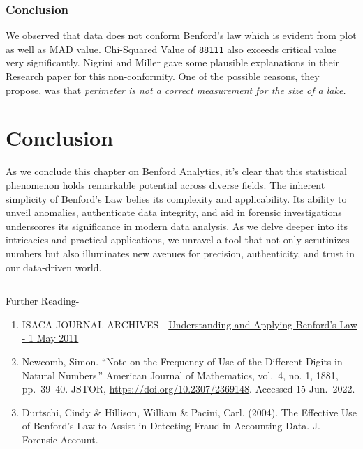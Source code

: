 \documentclass[
]{book}
\begin{document}
\hypertarget{conclusion-1}{%
\subsubsection*{Conclusion}\label{conclusion-1}}

We observed that data does not conform Benford's law which is evident from plot as well as MAD value. Chi-Squared Value of \texttt{88111} also exceeds critical value very significantly. Nigrini and Miller gave some plausible explanations in their Research paper \citep{article2007} for this non-conformity. One of the possible reasons, they propose, was that \emph{perimeter is not a correct measurement for the size of a lake.}

\hypertarget{conclusion-2}{%
\section{Conclusion}\label{conclusion-2}}

As we conclude this chapter on Benford Analytics, it's clear that this statistical phenomenon holds remarkable potential across diverse fields. The inherent simplicity of Benford's Law belies its complexity and applicability. Its ability to unveil anomalies, authenticate data integrity, and aid in forensic investigations underscores its significance in modern data analysis. As we delve deeper into its intricacies and practical applications, we unravel a tool that not only scrutinizes numbers but also illuminates new avenues for precision, authenticity, and trust in our data-driven world.

\begin{center}\rule{0.5\linewidth}{0.5pt}\end{center}

Further Reading-

\begin{enumerate}
\def\labelenumi{\arabic{enumi}.}
\item
  ISACA JOURNAL ARCHIVES - \href{https://www.isaca.org/resources/isaca-journal/past-issues/2011/understanding-and-applying-benfords-law}{Understanding and Applying Benford's Law - 1 May 2011}
\item
  Newcomb, Simon. ``Note on the Frequency of Use of the Different Digits in Natural Numbers.'' American Journal of Mathematics, vol.~4, no. 1, 1881, pp.~39--40. JSTOR, \url{https://doi.org/10.2307/2369148}. Accessed 15 Jun.~2022.
\item
  Durtschi, Cindy \& Hillison, William \& Pacini, Carl. (2004). The Effective Use of Benford's Law to Assist in Detecting Fraud in Accounting Data. J. Forensic Account.
\end{enumerate}
\end{document}
